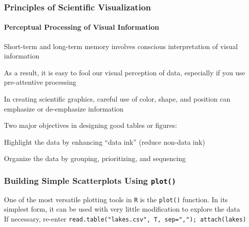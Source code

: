 \documentclass[10pt]{beamer}
\begin{document}
\begin{frame}
\frametitle{Principles of Scientific Visualization}
\framesubtitle{Perceptual Processing of Visual Information}

\bi 
\item Short-term and long-term memory involves
  conscious interpretation of visual information

\item As a result, it is easy to fool our visual perception of data,
  especially if you use pre-attentive processing

\item In creating scientific graphics, careful use of color, shape,
  and position can emphasize or de-emphasize information

\item {\color{red} Two major objectives} in designing good tables or
  figures:

\bi
\item {\color{blue} Highlight the data} by enhancing ``data ink''
  (reduce non-data ink)
\item {\color{blue} Organize the data} by grouping, prioritizing, and sequencing
\ei
\ei

\end{frame}


\begin{frame}[fragile]
\frametitle{Building Simple Scatterplots Using {\color{red} \tt plot()}}
\label{figTP1}
\vspace*{2ex}
{\scriptsize
One of the most versatile plotting tools in {\color{red} \tt R}
  is the {\color{red} \tt plot()} function. In its simplest form, it
  can be used with very little modification to explore the data\\
If necessary, re-enter {\color{red} \tt read.table("lakes.csv", T, sep=","); attach(lakes)}
}

\vspace*{-4ex}
\begin{center}
\end{center}
\end{frame}
\end{document}
